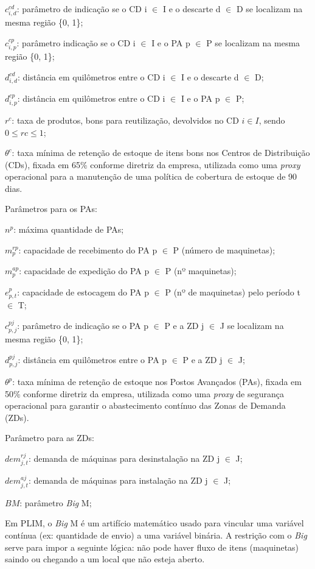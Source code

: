 $c^{cd}_{i,d}$: parâmetro de indicação se o CD i $\in$ I e o descarte d $\in$ D se localizam na mesma região \{0, 1\};

$c^{cp}_{i,p}$: parâmetro indicação se o CD i $\in$ I e o PA p $\in$ P se localizam na mesma região \{0, 1\};

$d^{cd}_{i,d}$: distância em quilômetros entre o CD i $\in$ I e o descarte d $\in$ D;

$d^{cp}_{i,p}$: distância em quilômetros entre o CD i $\in$ I e o PA p $\in$ P;

$r^{c}$: taxa de produtos, bons para reutilização, devolvidos no CD \( i \in I \), sendo \( 0 \leq rc \leq 1 \);

$\theta^{c}$: taxa mínima de retenção de estoque de itens bons nos Centros de Distribuição (CDs), fixada em 65\% conforme diretriz da empresa, utilizada como uma \textit{proxy} operacional para a manutenção de uma política de cobertura de estoque de 90 dias.

Parâmetros para os PAs:

$n^{p}$: máxima quantidade de PAs;

$m^{rp}_{p}$: capacidade de recebimento do PA p $\in$ P (número de maquinetas);

$m^{ap}_{p}$: capacidade de expedição do PA p $\in$ P (nº maquinetas);

$e^{p}_{p,t}$: capacidade de estocagem do PA p $\in$ P (nº de maquinetas) pelo período t $\in$ T;

$c^{pj}_{p,j}$: parâmetro de indicação se o PA p $\in$ P e a ZD j $\in$ J se localizam na mesma região \{0, 1\};

$d^{pj}_{p,j}$: distância em quilômetros entre o PA p $\in$ P e a ZD j $\in$ J;

$\theta^{p}$: taxa mínima de retenção de estoque nos Postos Avançados (PAs), fixada em 50\% conforme diretriz da empresa, utilizada como uma \textit{proxy} de segurança operacional para garantir o abastecimento contínuo das Zonas de Demanda (ZDs).

Parâmetro para as ZDs:

$dem^{rj}_{j,t}$: demanda de máquinas para desinstalação na ZD j $\in$ J;

$dem^{aj}_{j,t}$: demanda de máquinas para instalação na ZD j $\in$ J;

$BM$: parâmetro \emph{Big} M;

Em PLIM, o \textit{Big} M é um artifício matemático usado para vincular uma variável contínua (ex: quantidade de envio) a uma variável binária. A restrição com o \textit{Big} serve para impor a seguinte lógica: não pode haver fluxo de itens (maquinetas) saindo ou chegando a um local que não esteja aberto.


